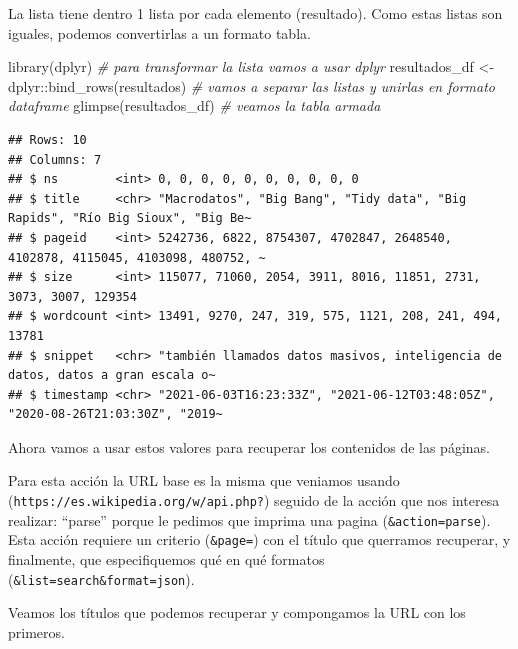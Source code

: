 \documentclass[
]{book}
\newenvironment{Shaded}{\begin{snugshade}}{\end{snugshade}}
\newcommand{\CommentTok}[1]{\textcolor[rgb]{0.56,0.35,0.01}{\textit{#1}}}
\newcommand{\FunctionTok}[1]{\textcolor[rgb]{0.00,0.00,0.00}{#1}}
\newcommand{\NormalTok}[1]{#1}
\newcommand{\OtherTok}[1]{\textcolor[rgb]{0.56,0.35,0.01}{#1}}
\newcommand{\SpecialCharTok}[1]{\textcolor[rgb]{0.00,0.00,0.00}{#1}}
\begin{document}
La lista tiene dentro 1 lista por cada elemento (resultado). Como estas listas son iguales, podemos convertirlas a un formato tabla.

\begin{Shaded}
\begin{Highlighting}[]
\FunctionTok{library}\NormalTok{(dplyr) }\CommentTok{\# para transformar la lista vamos a usar dplyr}
\NormalTok{resultados\_df }\OtherTok{\textless{}{-}}\NormalTok{ dplyr}\SpecialCharTok{::}\FunctionTok{bind\_rows}\NormalTok{(resultados) }\CommentTok{\# vamos a separar las listas y unirlas en formato dataframe}
\FunctionTok{glimpse}\NormalTok{(resultados\_df) }\CommentTok{\# veamos la tabla armada}
\end{Highlighting}
\end{Shaded}

\begin{verbatim}
## Rows: 10
## Columns: 7
## $ ns        <int> 0, 0, 0, 0, 0, 0, 0, 0, 0, 0
## $ title     <chr> "Macrodatos", "Big Bang", "Tidy data", "Big Rapids", "Río Big Sioux", "Big Be~
## $ pageid    <int> 5242736, 6822, 8754307, 4702847, 2648540, 4102878, 4115045, 4103098, 480752, ~
## $ size      <int> 115077, 71060, 2054, 3911, 8016, 11851, 2731, 3073, 3007, 129354
## $ wordcount <int> 13491, 9270, 247, 319, 575, 1121, 208, 241, 494, 13781
## $ snippet   <chr> "también llamados datos masivos, inteligencia de datos, datos a gran escala o~
## $ timestamp <chr> "2021-06-03T16:23:33Z", "2021-06-12T03:48:05Z", "2020-08-26T21:03:30Z", "2019~
\end{verbatim}

Ahora vamos a usar estos valores para recuperar los contenidos de las páginas.

Para esta acción la URL base es la misma que veniamos usando (\texttt{https://es.wikipedia.org/w/api.php?}) seguido de la acción que nos interesa realizar: ``parse'' porque le pedimos que imprima una pagina (\texttt{\&action=parse}).
Esta acción requiere un criterio (\texttt{\&page=}) con el título que querramos recuperar, y finalmente, que especifiquemos qué en qué formatos (\texttt{\&list=search\&format=json}).

Veamos los títulos que podemos recuperar y compongamos la URL con los primeros.

\begin{Shaded}
\end{Shaded}
\end{document}

